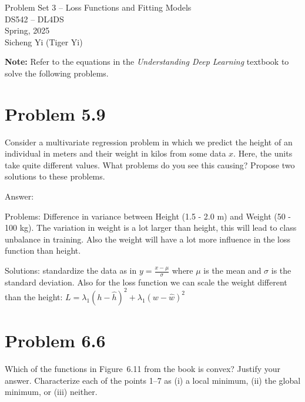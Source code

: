 \documentclass[10pt]{article}
\begin{document}
\begin{center}
    \LARGE {Problem Set 3 – Loss Functions and Fitting Models} \\[1em]
    \Large{DS542 – DL4DS} \\[0.5em]
    \large Spring, 2025 \\
    \large Sicheng Yi (Tiger Yi)
\end{center}

\vspace{2em}

\noindent\textbf{Note:} Refer to the equations in the \textit{Understanding Deep Learning} textbook to solve the following problems.

\vspace{2em}

\section*{Problem 5.9}
Consider a multivariate regression problem in which we predict the height of an individual in meters and their weight in kilos from some data $x$. Here, the units take quite different values. What problems do you see this causing? Propose two solutions to these problems.

\noindent Answer:

\noindent Problems: Difference in variance between Height (1.5 - 2.0 m) and Weight (50 - 100 kg). The variation in weight is a lot larger than height, this will lead to class unbalance in training.  Also the weight will have a lot more influence in the loss function than height. 

\noindent Solutions: standardize the data as in $y=\frac{x-\mu}{\sigma}$  where $\mu$ is the mean and $\sigma$ is the standard deviation. Also for the loss function we can scale the weight different than the height: $L = \lambda_1 (h - \hat{h})^2 + \lambda_1 (w - \hat{w})^2 $ 



\vspace{5em}


\newpage

\section*{Problem 6.6}
Which of the functions in Figure~6.11 from the book is convex? Justify your answer. Characterize each of the points 1--7 as (i) a local minimum, (ii) the global minimum, or (iii) neither.
\end{document}
